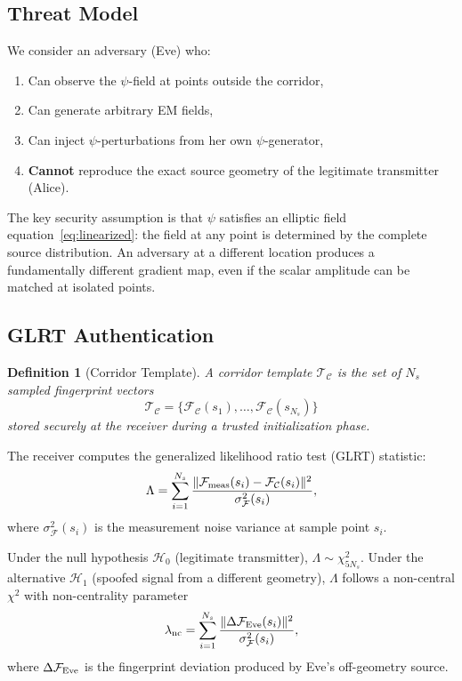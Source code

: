\documentclass[twocolumn,superscriptaddress,prd,nofootinbib]{revtex4-2}
\newcommand{\Corridor}{\mathcal{C}}
\newcommand{\Template}{\mathcal{T}}
\newcommand{\Fingerprint}{\mathcal{F}}
\newtheorem{definition}{Definition}
\begin{document}
\subsection{Threat Model}

We consider an adversary (Eve) who:
\begin{enumerate}[label=(E\arabic*)]
\item Can observe the $\psi$-field at points outside the corridor,
\item Can generate arbitrary EM fields,
\item Can inject $\psi$-perturbations from her own $\psi$-generator,
\item \textbf{Cannot} reproduce the exact source geometry of the
legitimate transmitter (Alice).
\end{enumerate}

The key security assumption is that $\psi$ satisfies an elliptic field
equation~\eqref{eq:linearized}: the field at any point is determined by
the complete source distribution.
An adversary at a different location produces a fundamentally different
gradient map, even if the scalar amplitude can be matched at isolated
points.

\subsection{GLRT Authentication}

\begin{definition}[Corridor Template]
A corridor template $\Template_\Corridor$ is the set of $N_s$ sampled
fingerprint vectors
\begin{equation}
\Template_\Corridor = \bigl\{\Fingerprint_\Corridor(s_1),\ldots,
\Fingerprint_\Corridor(s_{N_s})\bigr\}
\label{eq:template}
\end{equation}
stored securely at the receiver during a trusted initialization phase.
\end{definition}

The receiver computes the generalized likelihood ratio test (GLRT)
statistic:
\begin{equation}
\Lambda = \sum_{i=1}^{N_s} \frac{\|\Fingerprint_{\rm meas}(s_i) -
\Fingerprint_\Corridor(s_i)\|^2}{\sigma_\Fingerprint^2(s_i)},
\label{eq:GLRT}
\end{equation}
where $\sigma_\Fingerprint^2(s_i)$ is the measurement noise variance at
sample point $s_i$.

Under the null hypothesis $\mathcal{H}_0$ (legitimate transmitter),
$\Lambda \sim \chi^2_{5N_s}$.
Under the alternative $\mathcal{H}_1$ (spoofed signal from a different
geometry), $\Lambda$ follows a non-central $\chi^2$ with non-centrality
parameter
\begin{equation}
\lambda_{\rm nc} = \sum_{i=1}^{N_s}
\frac{\|\Delta\Fingerprint_{\rm Eve}(s_i)\|^2}{\sigma_\Fingerprint^2(s_i)},
\label{eq:non-centrality}
\end{equation}
where $\Delta\Fingerprint_{\rm Eve}$ is the fingerprint deviation
produced by Eve's off-geometry source.
\end{document}
